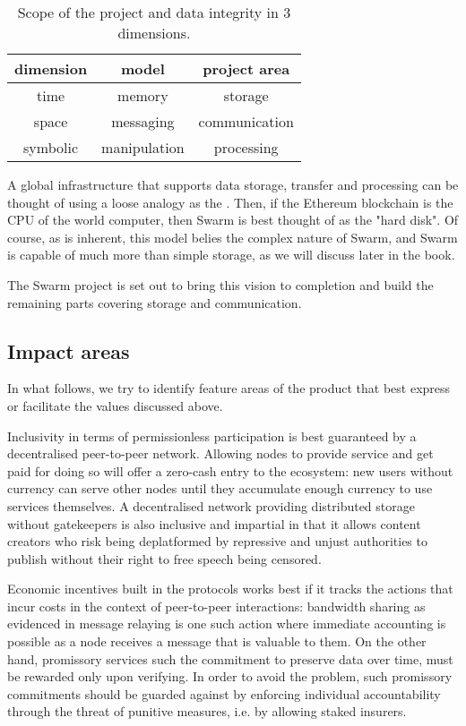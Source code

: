 \begin{table}[htb]
\centering
\begin{tabular}{c|c|c}
dimension & model & project area\\\hline
%
time & memory & storage \\
space & messaging & communication \\
symbolic & manipulation & processing \\
\end{tabular}
\caption{Scope of the project and data integrity in 3 dimensions.}
\label{tab:scope}
\end{table}

A global infrastructure that supports data storage, transfer and processing 
can be thought of using a loose analogy as the . Then, if the Ethereum blockchain is the CPU of the world computer, then Swarm is best thought of as the "hard disk". Of course, as is inherent, this model belies the complex nature of Swarm, and Swarm is capable of much more than simple storage, as we will discuss later in the book.

The Swarm project is set out to bring this vision to completion and build the remaining parts covering storage and communication. 

\subsection{Impact areas \statusorange}

In what follows, we try to identify feature areas of the product that best express or facilitate the values discussed above. 

Inclusivity in terms of permissionless participation is best guaranteed by a decentralised peer-to-peer network.  
Allowing nodes to provide service and get paid for doing so will offer a zero-cash entry to the ecosystem: new users without currency can serve other nodes until they accumulate enough currency to use services themselves. A decentralised network providing distributed storage without gatekeepers is also inclusive and impartial in that it allows content creators who risk being deplatformed by repressive and unjust authorities to publish without their right to free speech being censored. 

Economic incentives built in the protocols works best if it tracks the actions that incur costs in the context of peer-to-peer interactions: bandwidth sharing as evidenced in message relaying is one such action where immediate accounting is possible as a node receives a message that is valuable to them. On the other hand, promissory services such the commitment to preserve data over time, must be rewarded only upon verifying. In order to avoid the  problem, such promissory commitments should be guarded against by enforcing individual accountability through the threat of punitive measures, i.e. by allowing staked insurers.

